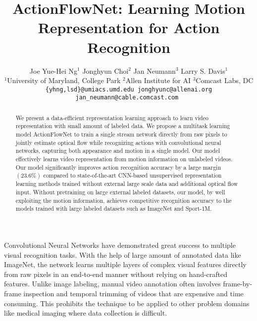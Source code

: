 \documentclass[10pt,twocolumn,letterpaper]{article}
\begin{document}
\title{ActionFlowNet: Learning Motion Representation for Action Recognition}
\author{
  Joe Yue-Hei Ng$^1$ \hspace{1em}
  Jonghyun Choi$^2$ \hspace{1em}
  Jan Neumann$^3$ \hspace{1em}
  Larry S. Davis$^1$ \vspace{.3em}
  \\
  $^1$University of Maryland, College Park \hspace{1.5em}
  $^2$Allen Institute for AI \hspace{1.5em}
  $^3$Comcast Labs, DC \vspace{.3em}\\
{\tt\small \{yhng,lsd\}@umiacs.umd.edu \hspace{1em}
jonghyunc@allenai.org \hspace{1em}
jan\_neumann@cable.comcast.com }
}

\maketitle
\ifwacvfinal\thispagestyle{empty}\fi

\begin{abstract}
We present a data-efficient representation learning approach to learn video representation with small amount of labeled data.
We propose a multitask learning model ActionFlowNet to train a single stream network directly from raw pixels to jointly estimate optical flow while recognizing actions with convolutional neural networks, capturing both appearance and motion in a single model.
Our model effectively learns video representation from motion information on unlabeled videos.
Our model significantly improves action recognition accuracy by a large margin $(23.6\%)$ compared to state-of-the-art CNN-based unsupervised representation learning methods trained without external large scale data and additional optical flow input.
Without pretraining on large external labeled datasets, our model, by well exploiting the motion information, achieves competitive recognition accuracy to the models trained with large labeled datasets such as ImageNet and Sport-1M.

\end{abstract}



Convolutional Neural Networks have demonstrated great success to multiple visual recognition tasks.
With the help of large amount of annotated data like ImageNet, the network learns multiple layers of complex visual features directly from raw pixels in an end-to-end manner without relying on hand-crafted features. 
Unlike image labeling, manual video annotation often involves frame-by-frame inspection and temporal trimming of videos that are expensive and time consuming. 
This prohibits the technique to be applied to other problem domains like medical imaging where data collection is difficult.
\end{document}
